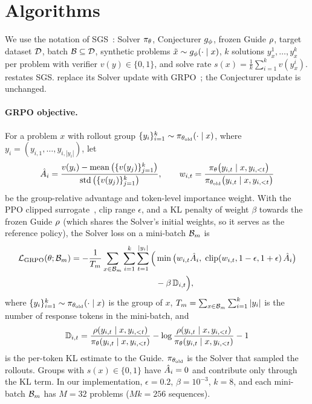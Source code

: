 
\section{Algorithms}
\label{sec:algorithms}

We use the notation of SGS~\citep{bailey2026scaling}: Solver $\pi_\theta$,
Conjecturer $g_\phi$, frozen Guide $\rho$, target dataset $\mathcal{D}$, batch
$\mathcal{B} \subseteq \mathcal{D}$, synthetic problems $\tilde{x} \sim g_\phi(\cdot \mid x)$, $k$
solutions $y_x^1,\dots,y_x^k$ per problem with verifier $v(y) \in \{0,1\}$,
and solve rate $s(x) = \frac{1}{k}\sum_{i=1}^{k} v(y_x^i)$.
 restates SGS. 
replace its Solver update with GRPO~\citep{shao2024deepseekmath}; the
Conjecturer update is unchanged.

\paragraph{GRPO objective.}
For a problem $x$ with rollout group $\{y_i\}_{i=1}^{k} \sim \pi_{\theta_{\mathrm{old}}}(\cdot \mid x)$,
where $y_i = (y_{i,1},\dots,y_{i,|y_i|})$, let
\begin{equation}
  \hat{A}_i = \frac{v(y_i) - \operatorname{mean}\big(\{v(y_j)\}_{j=1}^{k}\big)}
                 {\operatorname{std}\big(\{v(y_j)\}_{j=1}^{k}\big)},
  \qquad
  w_{i,t} = \frac{\pi_\theta\big(y_{i,t} \mid x, y_{i,<t}\big)}
                 {\pi_{\theta_{\mathrm{old}}}\big(y_{i,t} \mid x, y_{i,<t}\big)}
  \label{eq:grpo-adv}
\end{equation}
be the group-relative advantage and token-level importance weight. With the
PPO clipped surrogate~\citep{schulman2017proximal}, clip range $\epsilon$, and
a KL penalty of weight $\beta$ towards the frozen Guide $\rho$ (which shares
the Solver's initial weights, so it serves as the reference policy), the Solver
loss on a mini-batch $\mathcal{B}_m$ is
\begin{equation}
\begin{split}
  \mathcal{L}_{\mathrm{GRPO}}(\theta; \mathcal{B}_m) = -\frac{1}{T_m} \sum_{x \in \mathcal{B}_m} \sum_{i=1}^{k} \sum_{t=1}^{|y_i|}
  \Big( &\min\big( w_{i,t} \hat{A}_i,\; \operatorname{clip}(w_{i,t}, 1-\epsilon, 1+\epsilon)\, \hat{A}_i \big) \\
  &- \beta\, \mathbb{D}_{i,t} \Big),
\end{split}
\label{eq:grpo}
\end{equation}
where $\{y_i\}_{i=1}^{k} \sim \pi_{\theta_{\mathrm{old}}}(\cdot \mid x)$ is the group of $x$,
$T_m = \sum_{x \in \mathcal{B}_m} \sum_{i=1}^{k} |y_i|$ is the number of response tokens
in the mini-batch, and
\begin{equation}
  \mathbb{D}_{i,t} = \frac{\rho(y_{i,t} \mid x, y_{i,<t})}{\pi_\theta(y_{i,t} \mid x, y_{i,<t})}
  - \log \frac{\rho(y_{i,t} \mid x, y_{i,<t})}{\pi_\theta(y_{i,t} \mid x, y_{i,<t})} - 1
  \label{eq:kl}
\end{equation}
is the per-token KL estimate to the Guide. $\pi_{\theta_{\mathrm{old}}}$ is the Solver that
sampled the rollouts. Groups with
$s(x) \in \{0, 1\}$ have $\hat{A}_i = 0$ and contribute only through the KL
term. In our implementation, $\epsilon = 0.2$, $\beta = 10^{-3}$, $k = 8$,
and each mini-batch $\mathcal{B}_m$ has $M = 32$ problems ($Mk = 256$ sequences).

